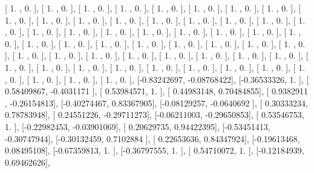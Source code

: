 \documentclass{article}
\begin{document}
       [ 1.        ,  0.        ],
       [ 1.        ,  0.        ],
       [ 1.        ,  0.        ],
       [ 1.        ,  0.        ],
       [ 1.        ,  0.        ],
       [ 1.        ,  0.        ],
       [ 1.        ,  0.        ],
       [ 1.        ,  0.        ],
       [ 1.        ,  0.        ],
       [ 1.        ,  0.        ],
       [ 1.        ,  0.        ],
       [ 1.        ,  0.        ],
       [ 1.        ,  0.        ],
       [ 1.        ,  0.        ],
       [ 1.        ,  0.        ],
       [ 1.        ,  0.        ],
       [ 1.        ,  0.        ],
       [ 1.        ,  0.        ],
       [ 1.        ,  0.        ],
       [ 1.        ,  0.        ],
       [ 1.        ,  0.        ],
       [ 1.        ,  0.        ],
       [ 1.        ,  0.        ],
       [ 1.        ,  0.        ],
       [ 1.        ,  0.        ],
       [ 1.        ,  0.        ],
       [ 1.        ,  0.        ],
       [ 1.        ,  0.        ],
       [ 1.        ,  0.        ],
       [ 1.        ,  0.        ],
       [ 1.        ,  0.        ],
       [ 1.        ,  0.        ],
       [ 1.        ,  0.        ],
       [ 1.        ,  0.        ],
       [ 1.        ,  0.        ],
       [ 1.        ,  0.        ],
       [ 1.        ,  0.        ],
       [ 1.        ,  0.        ],
       [ 1.        ,  0.        ],
       [ 1.        ,  0.        ],
       [ 1.        ,  0.        ],
       [ 1.        ,  0.        ],
       [ 1.        ,  0.        ],
       [ 1.        ,  0.        ],
       [ 1.        ,  0.        ],
       [ 1.        ,  0.        ],
       [ 1.        ,  0.        ],
       [ 1.        ,  0.        ],
       [ 1.        ,  0.        ],
       [ 1.        ,  0.        ],
       [ 1.        ,  0.        ],
       [ 1.        ,  0.        ],
       [ 1.        ,  0.        ],
       [-0.83242697, -0.08768422],
       [-0.36533326,  1.        ],
       [ 0.58409867, -0.4031171 ],
       [ 0.53984571,  1.        ],
       [ 0.44983148,  0.70484855],
       [ 0.9382911 , -0.26154813],
       [-0.40274467,  0.83367905],
       [-0.08129257, -0.0640692 ],
       [ 0.30333234,  0.78783948],
       [ 0.24551226, -0.29711273],
       [-0.06211003, -0.29650853],
       [ 0.53546753,  1.        ],
       [-0.22982453, -0.03901069],
       [ 0.20629735,  0.94422395],
       [-0.53451413, -0.30747944],
       [-0.30132459,  0.7102884 ],
       [ 0.22653636,  0.84347924],
       [-0.19613468,  0.08495108],
       [-0.67359813,  1.        ],
       [-0.36797555,  1.        ],
       [ 0.54710072,  1.        ],
       [-0.12184939,  0.69462626],
\end{document}
